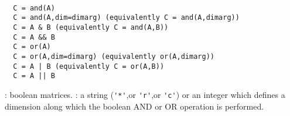 \begin{mandesc}
  \\
\end{mandesc}

\begin{calling_sequence}
\begin{verbatim}
  C = and(A)
  C = and(A,dim=dimarg) (equivalently C = and(A,dimarg))
  C = A & B (equivalently C = and(A,B))
  C = A && B 
  C = or(A)
  C = or(A,dim=dimarg) (equivalently or(A,dimarg))
  C = A | B (equivalently C = or(A,B))
  C = A || B 
\end{verbatim}
\end{calling_sequence}
\begin{parameters}
  \begin{varlist}
    : boolean matrices. 
    : a string (\verb!'*'!,or \verb!'r'!,or \verb!'c'!) or an integer which defines 
    a dimension along which the boolean AND or OR operation is performed. 
  \end{varlist}
\end{parameters}

